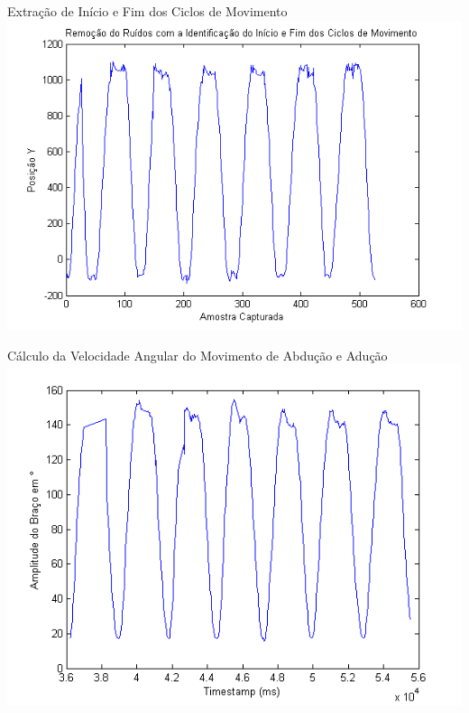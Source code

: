 \documentclass{beamer}
\begin{document}
\begin{frame}{Extração de Início e Fim dos Ciclos de Movimento}
      \center \includegraphics[height=3 in]{img/remocaoruidociclo.png}
\end{frame}




\begin{frame}{Cálculo da Velocidade Angular do Movimento de Abdução e Adução}
      \center \includegraphics[height=2.8 in]{img/amplitude-braco.png}
\end{frame}
\end{document}

